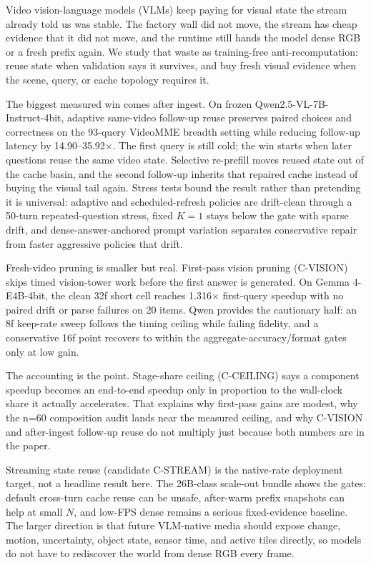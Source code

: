 Video vision-language models (VLMs) keep paying for visual state the stream
already told us was stable. The factory wall did not move, the stream has cheap
evidence that it did not move, and the runtime still hands the model dense RGB
or a fresh prefix again. We study that waste as training-free
anti-recomputation: reuse state when validation says it survives, and buy fresh
visual evidence when the scene, query, or cache topology requires it.

The biggest measured win comes after ingest. On frozen
Qwen2.5-VL-7B-Instruct-4bit, adaptive same-video follow-up reuse preserves
paired choices and correctness on the 93-query VideoMME breadth setting while
reducing follow-up latency by 14.90--35.92$\times$. The first query is still
cold; the win starts when later questions reuse the same video state.
Selective re-prefill moves reused state out of the cache basin, and the second
follow-up inherits that repaired cache instead of buying the visual tail again.
Stress tests bound
the result rather than pretending it is universal: adaptive and scheduled-refresh
policies are drift-clean through a 50-turn repeated-question stress, fixed
\(K=1\) stays below the gate with sparse drift, and dense-answer-anchored prompt
variation separates conservative repair from faster aggressive policies that
drift.

Fresh-video pruning is smaller but real. First-pass vision pruning
(C-VISION) skips timed vision-tower work before the first answer is generated.
On Gemma 4-E4B-4bit, the clean 32f short cell reaches 1.316$\times$
first-query speedup with no paired drift or parse failures on 20 items. Qwen
provides the cautionary half: an 8f keep-rate sweep follows the timing ceiling
while failing fidelity, and a conservative 16f point recovers to within the
aggregate-accuracy/format gates only at low gain.

The accounting is the point. Stage-share ceiling (C-CEILING) says a component
speedup becomes an end-to-end speedup only in proportion to the wall-clock share
it actually accelerates. That explains why first-pass gains are modest, why the
n=60 composition audit lands near the measured ceiling, and why C-VISION and
after-ingest follow-up reuse do not multiply just because both numbers are in
the paper.

Streaming state reuse (candidate C-STREAM) is the native-rate deployment target,
not a headline result here. The 26B-class scale-out bundle shows the gates:
default cross-turn cache reuse can be unsafe, after-warm prefix snapshots can
help at small \(N\), and low-FPS dense remains a serious fixed-evidence
baseline. The larger direction is that future VLM-native media should expose
change, motion, uncertainty, object state, sensor time, and active tiles
directly, so models do not have to rediscover the world from dense RGB every
frame.
